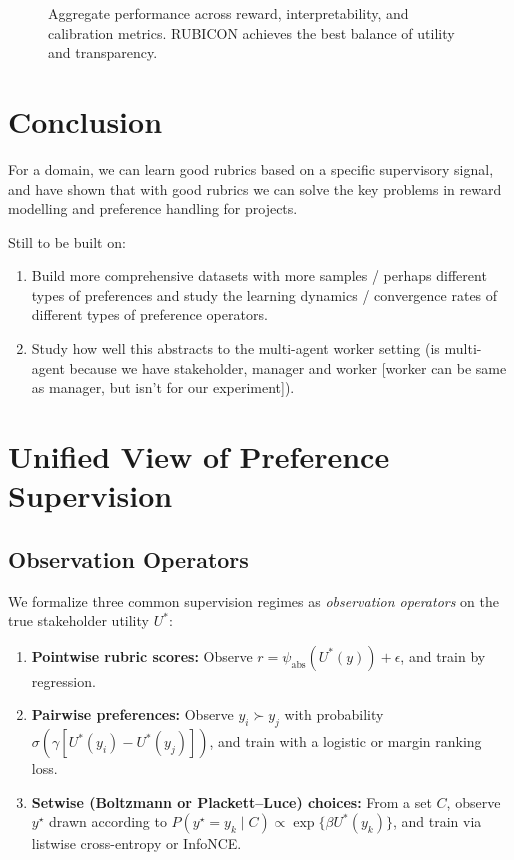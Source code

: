 \documentclass[sigconf]{acmart}
\begin{document}
\begin{figure}[h]
\centering
{}
\caption{Aggregate performance across reward, interpretability, and calibration metrics.
RUBICON achieves the best balance of utility and transparency.}
\label{fig:summary}
\end{figure}



\section{Conclusion}
For a domain, we can learn good rubrics based on a specific supervisory signal, and have shown that with good rubrics we can solve the key problems in reward modelling and preference handling for projects.

Still to be built on:
\begin{enumerate}
    \item Build more comprehensive datasets with more samples / perhaps different types of preferences and study the learning dynamics / convergence rates of different types of preference operators.
    \item Study how well this abstracts to the multi-agent worker setting (is multi-agent because we have stakeholder, manager and worker [worker can be same as manager, but isn’t for our experiment]).
\end{enumerate}

\appendix

\section{Unified View of Preference Supervision}
\label{appendix:unified-preference}

\subsection{Observation Operators}

We formalize three common supervision regimes as \emph{observation operators} on the true stakeholder utility \(U^*\):

\begin{enumerate}
    \item \textbf{Pointwise rubric scores:}
    Observe \(r = \psi_{\mathrm{abs}}(U^*(y)) + \epsilon\), and train by regression.
    \item \textbf{Pairwise preferences:}
    Observe \(y_i \succ y_j\) with probability \(\sigma(\gamma [U^*(y_i) - U^*(y_j)])\), and train with a logistic or margin ranking loss.
    \item \textbf{Setwise (Boltzmann or Plackett–Luce) choices:}
    From a set \(C\), observe \(y^\star\) drawn according to
    \(P(y^\star = y_k \mid C) \propto \exp\{\beta U^*(y_k)\}\),
    and train via listwise cross-entropy or InfoNCE.
\end{enumerate}
\end{document}
